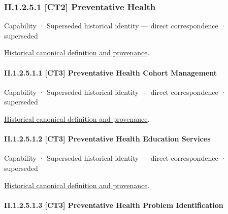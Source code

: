 \subsubsection*{II.1.2.5.1 [CT2] Preventative Health}
\label{navigation:II.1.2.5.1}

\label{element:80affa7bcd284ecbbcbc5092f8497ddf}
{\small Capability · Superseded historical identity — direct correspondence · superseded}\par
\href{../../../../continuum/strategy/capability/80affa7bcd284ecbbcbc5092f8497ddf.md}{Historical canonical definition and provenance}.\par
\paragraph*{II.1.2.5.1.1 [CT3] Preventative Health Cohort Management}
\label{navigation:II.1.2.5.1.1}

\label{element:fef479f0fd5048b19b2aec770f0233fe}
{\small Capability · Superseded historical identity — direct correspondence · superseded}\par
\href{../../../../continuum/strategy/capability/fef479f0fd5048b19b2aec770f0233fe.md}{Historical canonical definition and provenance}.\par
\paragraph*{II.1.2.5.1.2 [CT3] Preventative Health Education Services}
\label{navigation:II.1.2.5.1.2}

\label{element:dbe10959237f405caeadef2a5748303a}
{\small Capability · Superseded historical identity — direct correspondence · superseded}\par
\href{../../../../continuum/strategy/capability/dbe10959237f405caeadef2a5748303a.md}{Historical canonical definition and provenance}.\par
\paragraph*{II.1.2.5.1.3 [CT3] Preventative Health Problem Identification}
\label{navigation:II.1.2.5.1.3}


